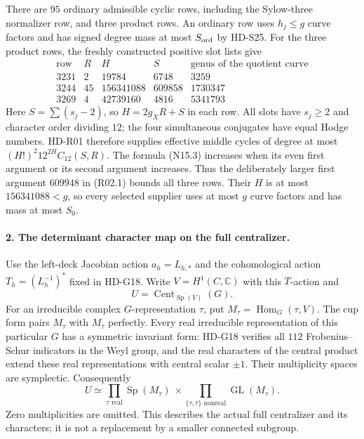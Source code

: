 There are $95$ ordinary admissible cyclic rows, including the
Sylow-three normalizer row, and three product rows. An ordinary row
uses $h_j\le g$ curve factors and has signed degree mass at most
$S_{\rm ord}$ by HD-S25. For the three product rows, the freshly
constructed positive slot lists give
\[
\begin{array}{c|r|r|r|r}
\text{row}&R&H&S&\text{genus of the quotient curve}\\\hline
3231&2&19784&6748&3259\\
3244&45&156341088&609858&1730347\\
3269&4&42739160&4816&5341793
\end{array}                                            \tag{R02.3}
\]
Here $S=\sum(s_j-2)$, so $H=2g_XR+S$ in each row.
All slots have $s_j\ge2$ and character order dividing $12$;
the four simultaneous conjugates have equal Hodge numbers.
HD-R01 therefore supplies effective middle cycles of degree at most
$(H!)^2 12^{2H}C_{12}(S,R)$.
The formula (N15.3) increases when its even first argument or its
second argument increases. Thus the deliberately larger first
argument $609948$ in (R02.1) bounds all three rows. Their $H$ is at
most $156341088<g$, so every selected supplier uses at most $g$
curve factors and has mass at most $S_0$.

\paragraph{2. The determinant character map on the full centralizer.}
Use the left-deck Jacobian action $a_h=L_{h,*}$ and the cohomological
action $T_h=(L_h^{-1})^*$ fixed in HD-G18. Write
$V=H^1(C,\mathbb C)$ with this $T$-action and
\[
              U=\operatorname{Cent}_{\operatorname{Sp}(V)}(G).
\]
For an irreducible complex $G$-representation $\tau$, put
$M_\tau=\operatorname{Hom}_G(\tau,V)$.
The cup form pairs $M_\tau$ with $M_{\bar\tau}$ perfectly.
Every real irreducible representation of this particular $G$ has a
symmetric invariant form: HD-G18 verifies all $112$ Frobenius--Schur
indicators in the Weyl group, and the real characters of the central
product extend these real representations with central scalar $\pm1$.
Their multiplicity spaces are symplectic. Consequently
\[
 U\simeq\prod_{\tau\text{ real}}\operatorname{Sp}(M_\tau)
       \ \times\!
       \prod_{\{\tau,\bar\tau\}\text{ nonreal}}
                         \operatorname{GL}(M_\tau).   \tag{R02.4}
\]
Zero multiplicities are omitted. This describes the actual full
centralizer and its characters; it is not a replacement by a smaller
connected subgroup.

